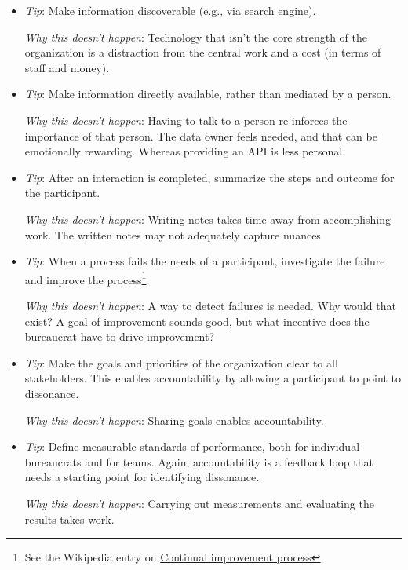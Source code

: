 \begin{itemize}
    \item \textit{Tip}: Make information discoverable (e.g., via search engine).

    \textit{Why this doesn't happen}: Technology that isn't the core strength of the organization is a distraction from the central work and a cost (in terms of staff and money).
    
    \item \textit{Tip}: Make information directly available, rather than mediated by a person. 

    \textit{Why this doesn't happen}: Having to talk to a person re-inforces the importance of that person. The data owner feels needed, and that can be emotionally rewarding. Whereas providing an API is less personal. 
    
    \item \textit{Tip}: After an interaction is completed, summarize the steps and outcome for the participant. 

    \textit{Why this doesn't happen}: Writing notes takes time away from accomplishing work. The written notes may not adequately capture nuances
    
    \item \textit{Tip}: When a process fails the needs of a participant, investigate the failure and improve the process\footnote{See the Wikipedia entry on \href{https://en.wikipedia.org/wiki/Continual_improvement_process}{Continual improvement process}}. 

    \textit{Why this doesn't happen}: A way to detect failures is needed. Why would that exist? A goal of improvement sounds good, but what incentive does the bureaucrat have to drive improvement?
    
    \item \textit{Tip}: Make the goals and priorities of the organization clear to all stakeholders. This enables accountability by allowing a participant to point to dissonance.  

    \textit{Why this doesn't happen}: Sharing goals enables accountability. 
    
    \item \textit{Tip}: Define measurable standards of performance, both for individual bureaucrats and for teams. Again, accountability is a feedback loop that needs a starting point for identifying dissonance.

    \textit{Why this doesn't happen}: Carrying out measurements and evaluating the results takes work. 
    

\end{itemize}
